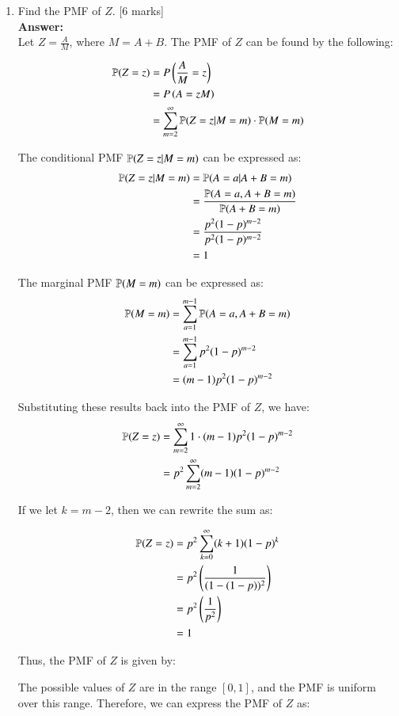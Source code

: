 \documentclass[12pt]{article}
\begin{document}
\begin{enumerate}
\begin{enumerate}
\item Find the PMF of $Z$.  
			\hfill [6 marks]
%
\\
\textbf{Answer:}
\\
Let $Z = \frac{A}{M}$, where $M = A + B$. The PMF of $Z$ can be found by the following:

\begin{align*}
  {\mathbb P}(Z=z) &= P\left(\frac{A}{M} = z\right) \\
  &= P\left(A = zM\right) \\
  &= \sum_{m=2}^{\infty} {\mathbb P}(Z=z | M=m) \cdot {\mathbb P}(M=m) \\
\end{align*}

The conditional PMF ${\mathbb P}(Z=z | M=m)$ can be expressed as:
\begin{align*}
  {\mathbb P}(Z=z | M=m) &= {\mathbb P}(A = a | A + B = m) \\
  &= \frac{{\mathbb P}(A = a, A + B = m)}{{\mathbb P}(A + B = m)} \\
  &= \frac{p^2(1-p)^{m-2}}{p^2(1-p)^{m-2}} \\
  &= 1
\end{align*}

The marginal PMF ${\mathbb P}(M=m)$ can be expressed as:
\begin{align*}
  {\mathbb P}(M=m) &= \sum_{a=1}^{m-1} {\mathbb P}(A=a, A + B = m) \\
  &= \sum_{a=1}^{m-1} p^2(1-p)^{m-2} \\
  &= (m-1)p^2(1-p)^{m-2}
\end{align*}

Substituting these results back into the PMF of $Z$, we have:
\begin{align*}
  {\mathbb P}(Z=z) &= \sum_{m=2}^{\infty} 1 \cdot (m-1)p^2(1-p)^{m-2} \\
  &= p^2 \sum_{m=2}^{\infty} (m-1)(1-p)^{m-2} \\
\end{align*}

If we let $k = m-2$, then we can rewrite the sum as:

\begin{align*}
  {\mathbb P}(Z=z) &= p^2 \sum_{k=0}^{\infty} (k+1)(1-p)^{k} \\
  &= p^2 \left(\frac{1}{(1-(1-p))^2}\right) \\
  &= p^2 \left(\frac{1}{p^2}\right) \\
  &= 1
\end{align*}

Thus, the PMF of $Z$ is given by:

The possible values of $Z$ are in the range $[0, 1]$, and the PMF is uniform over this range. Therefore, we can express the PMF of $Z$ as:


\end{enumerate}
\end{enumerate}
\end{document}
